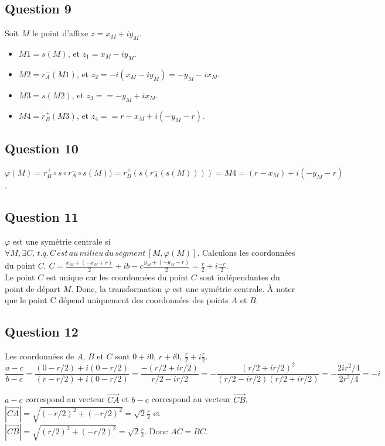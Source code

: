 \documentclass[]{book}
\theoremstyle{definition}
\begin{document}
\subsection*{Question 9}
Soit $M$ le point d'affixe $z=x_M + i y_M$. 
\begin{itemize}
\item $M1 = s(M)$, et $z_1 = x_M -i y_M$. 
\item $M2 = r_{A}^{-}(M1)$, et $z_2 = -i(x_M -i y_M) = -y_M - i x_M$. 
\item $M3 = s(M2)$, et $z_3 = = -y_M + i x_M$.
\item $M4 = r_{B}^{+}(M3)$, et $z_4 = = r-x_M + i(-y_M-r)$.  
\end{itemize}
 
\subsection*{Question 10}
$\varphi(M) = r_{B}^{+} \circ s \circ r_{A}^{-} \circ s(M)) = r_{B}^{+}(s(r_{A}^{-}(s(M)))) = M4 = (r-x_M) + i(-y_M-r)$.


\subsection*{Question 11}
$\varphi$ est une sym\'etrie centrale si $\forall M, \exists C,\, t.q.\, C\,est\,au\,milieu\,du\,segment\,[M,\varphi(M)]$. Calculons les coordonn\'ees du point $C$. $C = \frac{x_M + (-x_M + r)}{2} + ib-c\frac{y_M + (-y_M - r)}{2} = \frac{r}{2} + i\frac{-r}{2}$.\\
Le point $C$ est unique car les coordonn\'ees du point $C$ sont ind\'ependantes du point de d\'epart $M$. Donc, la transformation $\varphi$ est une sym\'etrie centrale. \`A noter que le point C d\'epend uniquement des coordonn\'ees des points $A$ et $B$.

\subsection*{Question 12}
Les coordonn\'ees de $A$, $B$ et $C$ sont $0+i0$, $r+i0$, $\frac{r}{2} + i\frac{r}{2}$.
$$\frac{a-c}{b-c} = \frac{(0-r/2)+i(0-r/2)}{(r-r/2)+i(0-r/2)} = \frac{-(r/2+ir/2)}{r/2-ir/2} = -\frac{(r/2+ir/2)^2}{(r/2-ir/2)(r/2+ir/2)} = -\frac{2ir^2/4}{2r^2/4} = -i$$


$a-c$ correspond au vecteur $\overrightarrow{CA}$ et $b-c$ correspond au vecteur $\overrightarrow{CB}$, $|\overrightarrow{CA}| = \sqrt{(-r/2)^2+(-r/2)^2} = \sqrt{2}\frac{r}{2}$ et $|\overrightarrow{CB}| = \sqrt{(r/2)^2+(-r/2)^2} = \sqrt{2}\frac{r}{2}$. Donc $AC=BC$.\\
\end{document}
